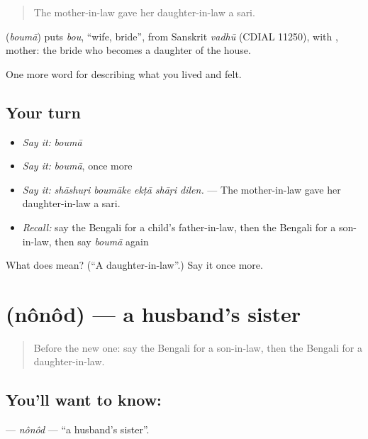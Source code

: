 \begin{quote}
The mother-in-law gave her daughter-in-law a sari.
\end{quote}

\begin{cousinweb}
\textbf{} (\emph{boumā}) puts \emph{bou}, \textquotedblleft{}wife, bride\textquotedblright{}, from Sanskrit \emph{vadhū} (CDIAL 11250), with , mother: the bride who becomes a daughter of the house.
\end{cousinweb}

\begin{grammarlens}[title={What you've built}]
One more word for describing what you lived and felt.
\end{grammarlens}

\subsection*{Your turn}
\begin{itemize}
\raggedright
  \item \emph{Say it:} \emph{boumā}
  \item \emph{Say it:} \emph{boumā}, once more
  \item \emph{Say it:} \emph{shāshuṛi boumāke ekṭā shāṛi dilen.} — The mother-in-law gave her daughter-in-law a sari.
  \item \emph{Recall:} say the Bengali for a child's father-in-law, then the Bengali for a son-in-law, then say \emph{boumā} again
\end{itemize}

\begin{tcolorbox}[breakable,colback=teal!4,colframe=teal!35!black,title={Before you move on}]
What does  mean? (\textquotedblleft{}A daughter-in-law\textquotedblright{}.) Say it once more.
\end{tcolorbox}
\section[\texorpdfstring{\bn{ননদ} (nônôd)}{ননদ (nônôd)}]{ (nônôd) — a husband's sister}

\label{lesson:BN-C483-nonod}



\begin{quote}
Before the new one: say the Bengali for a son-in-law, then the Bengali for a daughter-in-law.
\end{quote}

\subsection*{You'll want to know: }
\textbf{} — \emph{nônôd} — \textquotedblleft{}a husband's sister\textquotedblright{}.


